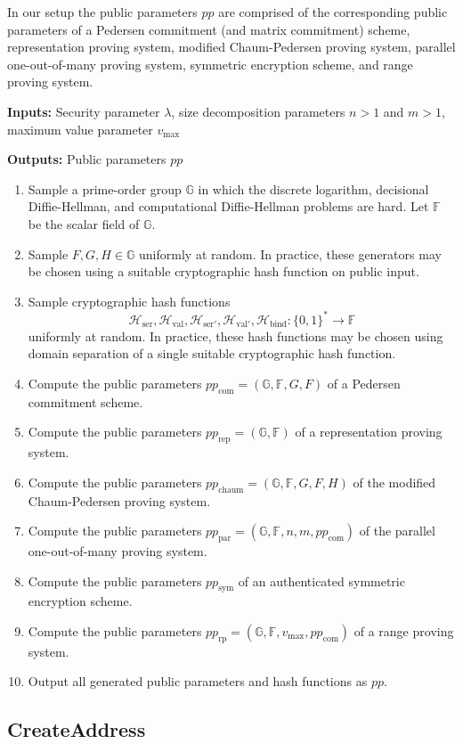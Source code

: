 \documentclass{llncs}
\newcommand{\G}{\mathbb{G}}
\newcommand{\F}{\mathbb{F}}
\newcommand{\hash}{\mathcal{H}}
\begin{document}
In our setup the public parameters $pp$ are comprised of the corresponding public parameters of a Pedersen commitment (and matrix commitment) scheme, representation proving system, modified Chaum-Pedersen proving system, parallel one-out-of-many proving system, symmetric encryption scheme, and range proving system.

\textbf{Inputs:} Security parameter $\lambda$, size decomposition parameters $n > 1$ and $m > 1$, maximum value parameter $v_{\text{max}}$

\textbf{Outputs:} Public parameters $pp$

\begin{enumerate}
\item Sample a prime-order group $\G$ in which the discrete logarithm, decisional Diffie-Hellman, and computational Diffie-Hellman problems are hard.
Let $\F$ be the scalar field of $\G$.
\item Sample $F,G,H \in \G$ uniformly at random.
In practice, these generators may be chosen using a suitable cryptographic hash function on public input.
\item Sample cryptographic hash functions $$\hash_{\text{ser}},\hash_{\text{val}},\hash_{\text{ser}'},\hash_{\text{val}'},\hash_{\text{bind}}: \{0,1\}^* \to \F$$ uniformly at random.
In practice, these hash functions may be chosen using domain separation of a single suitable cryptographic hash function.
\item Compute the public parameters $pp_{\text{com}} = (\G,\F,G,F)$ of a Pedersen commitment scheme.
\item Compute the public parameters $pp_{\text{rep}} = (\G,\F)$ of a representation proving system.
\item Compute the public parameters $pp_{\text{chaum}} = (\G,\F,G,F,H)$ of the modified Chaum-Pedersen proving system.
\item Compute the public parameters $pp_{\text{par}} = (\G,\F,n,m,pp_{\text{com}})$ of the parallel one-out-of-many proving system.
\item Compute the public parameters $pp_{\text{sym}}$ of an authenticated symmetric encryption scheme.
\item Compute the public parameters $pp_{\text{rp}} = (\G,\F,v_{\text{max}},pp_{\text{com}})$ of a range proving system.
\item Output all generated public parameters and hash functions as $pp$.
\end{enumerate}


\subsection{CreateAddress}
\end{document}
